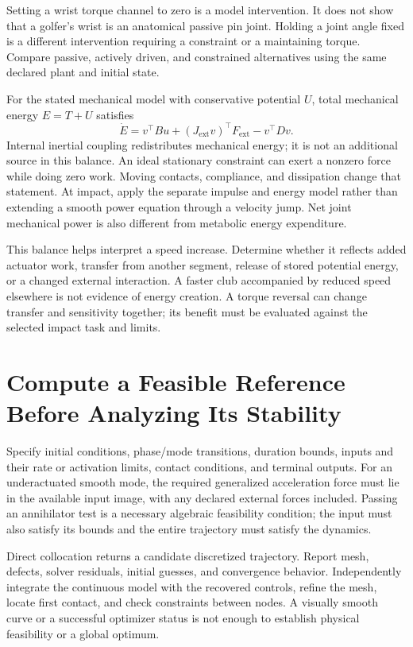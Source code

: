 \documentclass[12pt, openany]{book}
\theoremstyle{plain}
\begin{document}
Setting a wrist torque channel to zero is a model intervention. It does not show that a golfer's wrist is an anatomical passive pin joint. Holding a joint angle fixed is a different intervention requiring a constraint or a maintaining torque. Compare passive, actively driven, and constrained alternatives using the same declared plant and initial state.

For the stated mechanical model with conservative potential $U$, total mechanical energy $E=T+U$ satisfies
\begin{equation}
\dot E=v^\top B u+(J_{\mathrm{ext}}v)^\top F_{\mathrm{ext}}-v^\top Dv .
\end{equation}
Internal inertial coupling redistributes mechanical energy; it is not an additional source in this balance. An ideal stationary constraint can exert a nonzero force while doing zero work. Moving contacts, compliance, and dissipation change that statement. At impact, apply the separate impulse and energy model rather than extending a smooth power equation through a velocity jump. Net joint mechanical power is also different from metabolic energy expenditure.

This balance helps interpret a speed increase. Determine whether it reflects added actuator work, transfer from another segment, release of stored potential energy, or a changed external interaction. A faster club accompanied by reduced speed elsewhere is not evidence of energy creation. A torque reversal can change transfer and sensitivity together; its benefit must be evaluated against the selected impact task and limits.

\section{Compute a Feasible Reference Before Analyzing Its Stability}

Specify initial conditions, phase/mode transitions, duration bounds, inputs and their rate or activation limits, contact conditions, and terminal outputs. For an underactuated smooth mode, the required generalized acceleration force must lie in the available input image, with any declared external forces included. Passing an annihilator test is a necessary algebraic feasibility condition; the input must also satisfy its bounds and the entire trajectory must satisfy the dynamics.

Direct collocation returns a candidate discretized trajectory. Report mesh, defects, solver residuals, initial guesses, and convergence behavior. Independently integrate the continuous model with the recovered controls, refine the mesh, locate first contact, and check constraints between nodes. A visually smooth curve or a successful optimizer status is not enough to establish physical feasibility or a global optimum.
\end{document}
